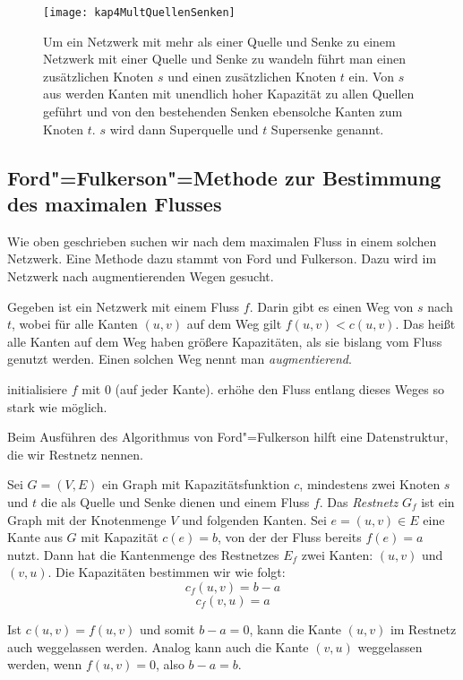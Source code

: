 \begin{figure}[htb]
  \centering
  \texttt{[image: kap4MultQuellenSenken]}
  \caption{Um ein Netzwerk mit mehr als einer Quelle und Senke zu einem Netzwerk mit einer Quelle und Senke zu wandeln führt man einen zusätzlichen Knoten $s$ und einen zusätzlichen Knoten $t$ ein. Von $s$ aus werden Kanten mit unendlich hoher Kapazität zu allen Quellen geführt und von den bestehenden Senken ebensolche Kanten zum Knoten $t$. $s$ wird dann Superquelle und $t$ Supersenke genannt.}
  \label{kap4MultQuellenSenken}
\end{figure}

\subsection{Ford"=Fulkerson"=Methode zur Bestimmung des maximalen Flusses}
Wie oben geschrieben suchen wir nach dem maximalen Fluss in einem solchen Netzwerk. Eine Methode dazu stammt von Ford und Fulkerson. Dazu wird im Netzwerk nach augmentierenden Wegen gesucht.

\begin{Def}
  \hspace{\parindent} Gegeben ist ein Netzwerk mit einem Fluss $f$. Darin gibt es einen Weg von $s$ nach $t$, wobei für alle Kanten $(u,v)$ auf dem Weg gilt $f(u,v) < c(u,v)$. Das heißt alle Kanten auf dem Weg haben größere Kapazitäten, als sie bislang vom Fluss genutzt werden. Einen solchen Weg nennt man \textit{augmentierend}.
\end{Def}

\strut\begin{Alg}
  \begin{algorithmic}[1]
    \State initialisiere $f$ mit $0$ (auf jeder Kante).
      \State erhöhe den Fluss entlang dieses Weges so stark wie möglich.
    \EndWhile
  \end{algorithmic}
\end{Alg}

Beim Ausführen des Algorithmus von Ford"=Fulkerson hilft eine Datenstruktur, die wir Restnetz nennen.
\begin{Def}[Restnetz]
  \hspace{\parindent}Sei $G=(V,E)$ ein Graph mit Kapazitätsfunktion $c$, mindestens zwei Knoten $s$ und $t$ die als Quelle und Senke dienen und einem Fluss $f$. Das \textit{Restnetz} $G_f$ ist ein Graph mit der Knotenmenge $V$ und folgenden Kanten. Sei $e=(u, v) \in E$ eine Kante aus $G$ mit Kapazität $c(e)=b$, von der der Fluss bereits $f(e)=a$ nutzt. Dann hat die Kantenmenge des Restnetzes $E_f$ zwei Kanten: $(u,v)$ und $(v,u)$. Die Kapazitäten bestimmen wir wie folgt:
  \[ c_f(u,v) = b-a \]
  \[ c_f(v,u) = a \]
  
  Ist $c(u,v) = f(u,v)$ und somit $b-a = 0$, kann die Kante $(u,v)$ im Restnetz auch weggelassen werden. Analog kann auch die Kante $(v,u)$ weggelassen werden, wenn $f(u,v)=0$, also $b-a = b$.
\end{Def}

